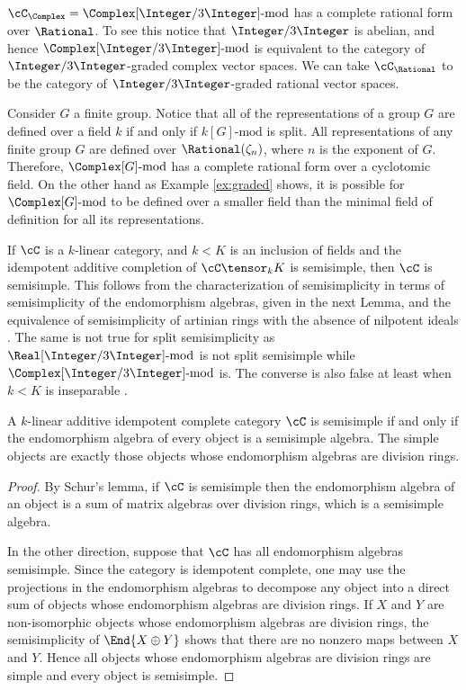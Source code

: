 \begin{example} \label{ex:graded}
$\cC_\Complex = \Complex[\Integer/3 \Integer]\text{-mod}$ has a complete rational form over $\Rational$.  To see this notice that $\Integer/3\Integer$ is abelian, and hence $\Complex[\Integer/3 \Integer]\text{-mod}$ is equivalent to the category of $\Integer/3 \Integer$-graded complex vector spaces.  We can take $\cC_\Rational$ to be the category of $\Integer/3 \Integer$-graded rational vector spaces.
\end{example}

\begin{example} \label{ex:incomplete}
Consider $G$ a finite group.  Notice that all of the representations of a group $G$ are defined over a field $k$ if and only if $k[G]\text{-mod}$ is split.  All representations of any finite group $G$ are defined over $\Rational(\zeta_{n})$, where $n$ is the exponent of $G$.  Therefore, $\Complex[G]\text{-mod}$ has a complete rational form over a cyclotomic field.  On the other hand as Example \ref{ex:graded} shows, it is possible for $\Complex[G]\text{-mod}$ to be defined over a smaller field than the minimal field of definition for all its representations.
\end{example}

If $\cC$ is a $k$-linear category, and $k < K$ is an inclusion of fields and the idempotent additive completion of $\cC \tensor_k K$ is semisimple, then $\cC$ is semisimple.  This follows from the characterization of semisimplicity in terms of semisimplicity of the endomorphism algebras, given in the next Lemma, and the equivalence of semisimplicity of artinian rings with the absence of nilpotent ideals \cite[p. 203]{MR1009787}.  The same is not true for split semisimplicity as  $\Real[\Integer/3 \Integer]\text{-mod}$ is not split semisimple while  $\Complex[\Integer/3 \Integer]\text{-mod}$ is.  The converse is also false at least when $k<K$ is inseparable \cite[Question 5.1]{MR1995781}.


\begin{lem}
A $k$-linear additive idempotent complete category $\cC$ is semisimple if and only if the endomorphism algebra of every object is a semisimple algebra.  The simple objects are exactly those objects whose endomorphism algebras are division rings.
\end{lem}
\begin{proof}
By Schur's lemma, if $\cC$ is semisimple then the endomorphism algebra of an object is a sum of matrix algebras over division rings, which is a semisimple algebra.

In the other direction, suppose that $\cC$ has all endomorphism algebras semisimple.  Since the category is idempotent complete, one may use the projections in the endomorphism algebras to decompose any object into a direct sum of objects whose endomorphism algebras are division rings.  If $X$ and $Y$ are non-isomorphic objects whose endomorphism algebras are division rings, the semisimplicity of $\End{X\oplus Y}$ shows that there are no nonzero maps between $X$ and $Y$.  Hence all objects whose endomorphism algebras are division rings are simple and every object is semisimple.
\end{proof}


